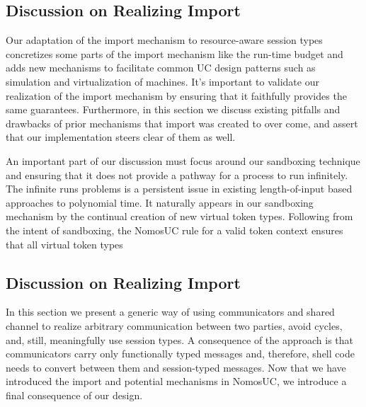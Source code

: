 %

\subsection{Discussion on Realizing Import}
Our adaptation of the import mechanism to resource-aware session types concretizes some parts of the import mechanism like the run-time budget and adds new mechanisms
to facilitate common UC design patterns such as simulation and virtualization of machines. 
It's important to validate our realization of the import mechanism by ensuring that it faithfully provides the same guarantees.
Furthermore, in this section we discuss existing pitfalls and drawbacks of prior mechanisms that import was created to over come, and assert that our implementation steers clear of them as well.

An important part of our discussion must focus around our sandboxing technique and ensuring that it does not provide a pathway for a process to run infinitely.
The infinite runs problems is a persistent issue in existing length-of-input based approaches to polynomial time.
It naturally appears in our sandboxing mechanism by the continual creation of new virtual token types. Following from the intent of sandboxing, the NomosUC rule for a valid token context ensures that all virtual token types  

\subsection{Discussion on Realizing Import}
In this section we present a generic way of using communicators and shared channel to realize arbitrary communication between two parties, avoid cycles, and, still, meaningfully use session types.
A consequence of the approach is that communicators carry only functionally typed messages and, therefore, shell code needs to convert between them and session-typed messages.
Now that we have introduced the import and potential mechanisms in NomosUC, we introduce a final consequence of our design.


